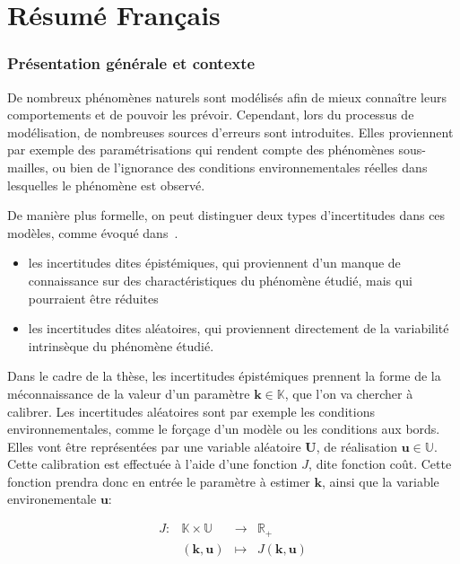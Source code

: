 \documentclass[../../Main_ManuscritThese.tex]{subfiles}
\begin{document}
\chapter*{Résumé Français}
\TitleBtwLines

{}
\label{chap:resume_fr}
\pagestyle{contentStyle}

\subsection{Présentation générale et contexte}
De nombreux phénomènes naturels sont modélisés afin de mieux connaître leurs comportements et de pouvoir les prévoir.
Cependant, lors du processus de modélisation, de nombreuses sources d'erreurs sont introduites. Elles proviennent par exemple des paramétrisations qui rendent compte des phénomènes sous-mailles, ou bien de l'ignorance des conditions environnementales réelles dans lesquelles le phénomène est observé.

De manière plus formelle, on peut distinguer deux types d'incertitudes dans ces modèles, comme évoqué dans~\cite{walker_defining_2003}.
\begin{itemize}
\item les incertitudes dites épistémiques, qui proviennent d'un manque de connaissance sur des charactéristiques du phénomène étudié, mais qui pourraient être réduites 
\item les incertitudes dites aléatoires, qui proviennent directement de la variabilité intrinsèque du phénomène étudié.
\end{itemize}

Dans le cadre de la thèse, les incertitudes épistémiques prennent la forme de la méconnaissance de la valeur d'un paramètre $\mathbf{k} \in \mathbb{K}$, que l'on va chercher à calibrer. Les incertitudes aléatoires sont par exemple les conditions environnementales, comme le forçage d'un modèle ou les conditions aux bords. Elles vont être représentées par une variable aléatoire $\mathbf{U}$, de réalisation $\mathbf{u}\in\mathbb{U}$.
Cette calibration est effectuée à l'aide d'une fonction $J$, dite fonction coût. Cette fonction prendra donc en entrée le paramètre à estimer $\mathbf{k}$, ainsi que la variable environementale $\mathbf{u}$:

\begin{equation}
  \label{eq:def_J}
  \begin{array}{rccc}
   J: & \mathbb{K}\times\mathbb{U}& \rightarrow& \mathbb{R}_+ \\
   &(\mathbf{k},\mathbf{u})& \mapsto& J(\mathbf{k},\mathbf{u})
  \end{array}
\end{equation}
\end{document}
